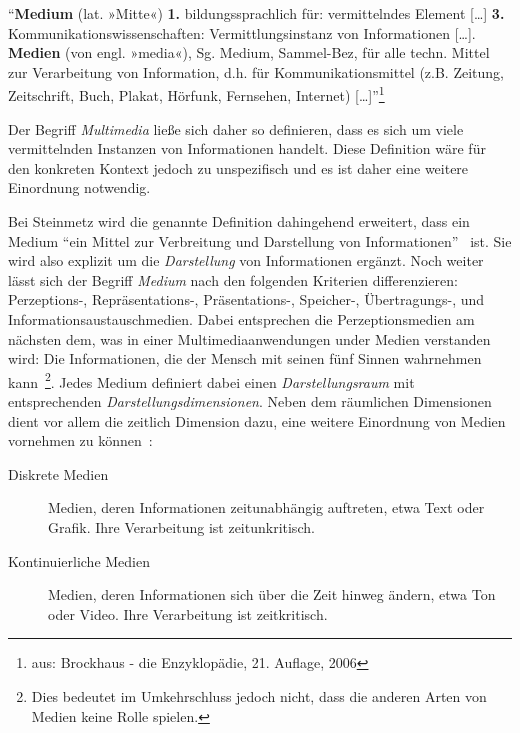  \begin{definition}\label{def:medium}
    "`\textbf{Medium} (lat. »Mitte«) \textbf{1.} bildungssprachlich für: vermittelndes Element [\ldots] \textbf{3.} Kommunikationswissenschaften: Vermittlungsinstanz von Informationen [\ldots]. \textbf{Medien} (von engl. »media«), Sg. Medium, Sammel-Bez, für alle techn. Mittel zur Verarbeitung von Information, d.h. für Kommunikationsmittel (z.B. Zeitung, Zeitschrift, Buch, Plakat, Hörfunk, Fernsehen, Internet) [\ldots]"'\footnote{aus: Brockhaus - die Enzyklopädie, 21. Auflage, 2006}
  \end{definition}
  
  Der Begriff \emph{Multimedia} ließe sich daher so definieren, dass es sich um viele vermittelnden Instanzen von Informationen handelt. Diese Definition wäre für den konkreten Kontext jedoch zu unspezifisch und es ist daher eine weitere Einordnung notwendig.
  
  Bei Steinmetz wird die genannte Definition dahingehend erweitert, dass ein Medium "`ein Mittel zur Verbreitung und Darstellung von Informationen"'~\citep[S. 7]{multimedia_technologie} ist. Sie wird also explizit um die \emph{Darstellung} von Informationen ergänzt. Noch weiter lässt sich der Begriff \emph{Medium} nach den folgenden Kriterien differenzieren: Perzeptions-, Repräsentations-, Präsentations-, Speicher-, Übertragungs-, und Informationsaustauschmedien. Dabei entsprechen die Perzeptionsmedien am nächsten dem, was in einer Multimediaanwendungen under Medien verstanden wird: Die Informationen, die der Mensch mit seinen fünf Sinnen wahrnehmen kann~\citep[S. 9]{multimedia_technologie}\footnote{Dies bedeutet im Umkehrschluss jedoch nicht, dass die anderen Arten von Medien keine Rolle spielen.}. Jedes Medium definiert dabei einen \emph{Darstellungsraum} mit entsprechenden \emph{Darstellungsdimensionen}. Neben dem räumlichen Dimensionen dient vor allem die zeitlich Dimension dazu, eine weitere Einordnung von Medien vornehmen zu können~\citep[S. 10]{multimedia_technologie}:
  
  \begin{description}
    \item[Diskrete Medien] Medien, deren Informationen zeitunabhängig auftreten, etwa Text oder Grafik. Ihre Verarbeitung ist zeitunkritisch.
    \item[Kontinuierliche Medien] Medien, deren Informationen sich über die Zeit hinweg ändern, etwa Ton oder Video. Ihre Verarbeitung ist zeitkritisch.
  \end{description}

